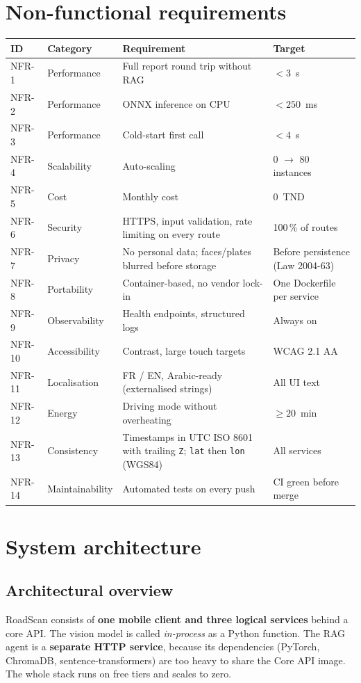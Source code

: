 \documentclass[11pt,a4paper,oneside]{report}
\begin{document}
\chapter{Non-functional requirements}
\begin{longtable}{@{}L{1.4cm}L{2.4cm}L{5.4cm}L{4.6cm}@{}}
\toprule\textbf{ID} & \textbf{Category} & \textbf{Requirement} & \textbf{Target}\\\midrule\endhead
NFR-1 & Performance & Full report round trip without RAG & $<3$~s\\
NFR-2 & Performance & ONNX inference on CPU & $<250$~ms\\
NFR-3 & Performance & Cold-start first call & $<4$~s\\
NFR-4 & Scalability & Auto-scaling & 0 $\rightarrow$ 80 instances\\
NFR-5 & Cost & Monthly cost & 0~TND\\
NFR-6 & Security & HTTPS, input validation, rate limiting on every route & 100\,\% of routes\\
NFR-7 & Privacy & No personal data; faces/plates blurred before storage & Before persistence (Law 2004-63)\\
NFR-8 & Portability & Container-based, no vendor lock-in & One Dockerfile per service\\
NFR-9 & Observability & Health endpoints, structured logs & Always on\\
NFR-10 & Accessibility & Contrast, large touch targets & WCAG 2.1 AA\\
NFR-11 & Localisation & FR / EN, Arabic-ready (externalised strings) & All UI text\\
NFR-12 & Energy & Driving mode without overheating & $\geq20$~min\\
NFR-13 & Consistency & Timestamps in UTC ISO 8601 with trailing \texttt{Z}; \texttt{lat} then \texttt{lon} (WGS84) & All services\\
NFR-14 & Maintainability & Automated tests on every push & CI green before merge\\\bottomrule
\end{longtable}

\chapter{System architecture}
\section{Architectural overview}
RoadScan consists of \textbf{one mobile client and three logical services} behind a core API. The vision model
is called \emph{in-process} as a Python function. The RAG agent is a \textbf{separate HTTP service}, because its
dependencies (PyTorch, ChromaDB, sentence-transformers) are too heavy to share the Core API image. The whole
stack runs on free tiers and scales to zero.
\end{document}
